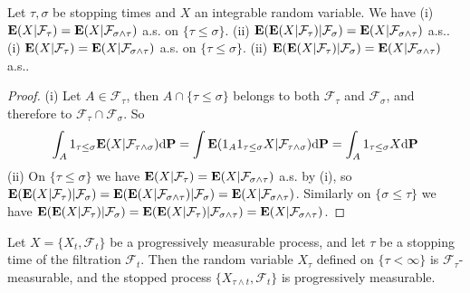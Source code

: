 \begin{theorem}
    Let $\tau,\sigma$ be stopping times and $X$ an integrable random variable. We have \newline 
    (i) $\mathbf{E}(X|\mathcal{F}_\tau)=\mathbf{E}(X|\mathcal{F}_{\sigma\wedge \tau})$ a.s. on $\{\tau\leq \sigma\}$.\newline 
    (ii) $\mathbf{E}(\mathbf{E}(X|\mathcal{F}_\tau)|\mathcal{F}_\sigma)=\mathbf{E}(X|\mathcal{F}_{\sigma\wedge \tau})$ a.s..
    (i) $\mathbf{E}(X|\mathcal{F}_\tau)=\mathbf{E}(X|\mathcal{F}_{\sigma\wedge \tau})$ a.s. on $\{\tau\leq \sigma\}$.\newline 
    (ii) $\mathbf{E}(\mathbf{E}(X|\mathcal{F}_\tau)|\mathcal{F}_\sigma)=\mathbf{E}(X|\mathcal{F}_{\sigma\wedge \tau})$ a.s..
\end{theorem}
\begin{proof}
    (i) Let $A\in\mathcal{F}_\tau$, then $A\cap \{\tau\leq \sigma\}$ belongs to both $\mathcal{F}_\tau$ and $\mathcal{F}_\sigma$, and therefore to $\mathcal{F}_\tau\cap\mathcal{F}_\sigma$. So 
    \[ \int_A 1_{\tau\leq \sigma} \mathbf{E}(X|\mathcal{F}_{\tau\wedge\sigma})\mathrm{d}\mathbf{P}=\int \mathbf{E}(1_A1_{\tau\leq \sigma}X|\mathcal{F}_{\tau\wedge\sigma})\mathrm{d}\mathbf{P}=\int_A1_{\tau\leq \sigma}X\mathrm{d}\mathbf{P}\]
    (ii) On $\{\tau\leq\sigma\}$ we have $\mathbf{E}(X|\mathcal{F}_\tau)=\mathbf{E}(X|\mathcal{F}_{\sigma\wedge \tau})$ a.s. by (i), so 
    $\mathbf{E}(\mathbf{E}(X|\mathcal{F}_\tau)|\mathcal{F}_\sigma)=\mathbf{E}(\mathbf{E}(X|\mathcal{F}_{\sigma\wedge \tau})|\mathcal{F}_\sigma)=\mathbf{E}(X|\mathcal{F}_{\sigma\wedge \tau})$. Similarly on
    $\{\sigma\leq \tau\}$ we have $\mathbf{E}(\mathbf{E}(X|\mathcal{F}_\tau)|\mathcal{F}_\sigma)=\mathbf{E}(\mathbf{E}(X|\mathcal{F}_\tau)|\mathcal{F}_{\sigma\wedge \tau})=\mathbf{E}(X|\mathcal{F}_{\sigma\wedge \tau})$.
\end{proof}
\begin{theorem}
    Let $X=\{X_t,\mathcal{F}_t\}$ be a progressively measurable process, and let $\tau$ be a stopping time of the filtration $\mathcal{F}_t$.
    Then the random variable $X_\tau$ defined on $\{\tau<\infty\}$ is $\mathcal{F}_\tau$-measurable, and the stopped process 
    $\{X_{\tau\wedge t},\mathcal{F}_t\}$ is progressively measurable.
\end{theorem}



